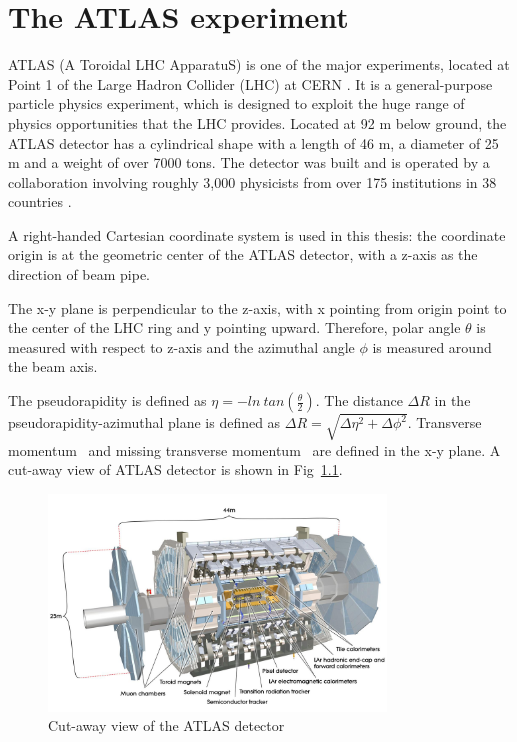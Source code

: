 \chapter{The ATLAS experiment}

\label{ch:atlas}
\par ATLAS (A Toroidal LHC ApparatuS) is one of the major experiments, located at Point 1 of the Large Hadron Collider (LHC) at CERN \cite{Aad:2008zzm}. It is a general-purpose particle physics experiment, which is designed to exploit the huge range of physics opportunities that the LHC provides. Located at 92 m below ground, the ATLAS detector has a cylindrical shape with a length of 46 m, a diameter of 25 m and a weight of over 7000 tons.
 The detector was built and is operated by a collaboration involving roughly 3,000 physicists from over 175 institutions in 38 countries \cite{fact}.

\par A right-handed Cartesian coordinate system is used in this thesis: the coordinate origin is at the geometric center of the ATLAS detector, with a z-axis as the direction of beam pipe.

\par The x-y plane is perpendicular to the z-axis, with x pointing from origin point to the center of the LHC ring and y pointing upward. Therefore, polar angle $\theta$ is measured with respect to z-axis and the azimuthal angle $\phi$ is measured around the beam axis. 

\par The pseudorapidity is defined as $\eta = -ln~tan(\frac{\theta}{2})$. The distance $\Delta R$ in the pseudorapidity-azimuthal plane is defined as $\Delta R = \sqrt{\Delta\eta^2 + \Delta\phi^2}$. Transverse momentum \pt~and missing transverse momentum \met~are defined in the x-y plane. A cut-away view of ATLAS detector is shown in Fig~\ref{fig:cutaway}.

\begin{figure}[htbp]
    \centering
    \includegraphics[width=0.8\textwidth]{chapters/c4/figures/atlas.jpg}
    \caption{Cut-away view of the ATLAS detector}
    \label{fig:cutaway}
\end{figure}

